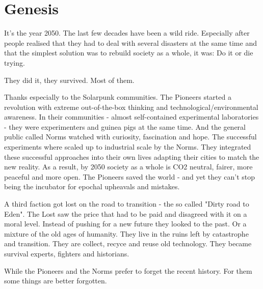 \chapter{Genesis}

It's the year 2050. The last few decades have been a wild ride. Especially after people realised that they had to deal with several disasters at the same time and that the simplest solution was to rebuild society as a whole, it was: Do it or die trying.

They did it, they survived. Most of them.

Thanks especially to the Solarpunk communities. The Pioneers started a revolution with extreme out-of-the-box thinking and technological/environmental awareness. In their communities - almost self-contained experimental laboratories - they were experimenters and guinea pigs at the same time. And the general public called Norms watched with curiosity, fascination and hope. The successful experiments where scaled up to industrial scale by the Norms. They integrated these successful approaches into their own lives adapting their cities to match the new reality.
As a result, by 2050 society as a whole is CO2 neutral, fairer, more peaceful and more open.
The Pioneers saved the world - and yet they can't stop being the incubator for epochal upheavals and mistakes.

A third faction got lost on the road to transition - the so called "Dirty road to Eden". The Lost saw the price that had to be paid and disagreed with it on a moral level. Instead of pushing for a new future they looked to the past. Or a mixture of the old ages of humanity. They live in the ruins left by catastrophe and transition. They are collect, recyce and reuse old technology. They became survival experts, fighters and historians.

While the Pioneers and the Norms prefer to forget the recent history. For them some things are better forgotten.